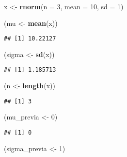 \documentclass[
  12pt,
]{book}
\newenvironment{Shaded}{\begin{snugshade}}{\end{snugshade}}
\newcommand{\DataTypeTok}[1]{\textcolor[rgb]{0.13,0.29,0.53}{#1}}
\newcommand{\DecValTok}[1]{\textcolor[rgb]{0.00,0.00,0.81}{#1}}
\newcommand{\KeywordTok}[1]{\textcolor[rgb]{0.13,0.29,0.53}{\textbf{#1}}}
\newcommand{\NormalTok}[1]{#1}
\newcommand{\StringTok}[1]{\textcolor[rgb]{0.31,0.60,0.02}{#1}}
\begin{document}
\begin{Shaded}
\begin{Highlighting}[]
\NormalTok{x \textless{}{-}}\StringTok{ }\KeywordTok{rnorm}\NormalTok{(}\DataTypeTok{n =} \DecValTok{3}\NormalTok{, }\DataTypeTok{mean =} \DecValTok{10}\NormalTok{, }\DataTypeTok{sd =} \DecValTok{1}\NormalTok{)}

\NormalTok{(mu \textless{}{-}}\StringTok{ }\KeywordTok{mean}\NormalTok{(x))}
\end{Highlighting}
\end{Shaded}

\begin{verbatim}
## [1] 10.22127
\end{verbatim}

\begin{Shaded}
\begin{Highlighting}[]
\NormalTok{(sigma \textless{}{-}}\StringTok{ }\KeywordTok{sd}\NormalTok{(x))}
\end{Highlighting}
\end{Shaded}

\begin{verbatim}
## [1] 1.185713
\end{verbatim}

\begin{Shaded}
\begin{Highlighting}[]
\NormalTok{(n \textless{}{-}}\StringTok{ }\KeywordTok{length}\NormalTok{(x))}
\end{Highlighting}
\end{Shaded}

\begin{verbatim}
## [1] 3
\end{verbatim}

\begin{Shaded}
\begin{Highlighting}[]
\NormalTok{(mu\_previa \textless{}{-}}\StringTok{ }\DecValTok{0}\NormalTok{)}
\end{Highlighting}
\end{Shaded}

\begin{verbatim}
## [1] 0
\end{verbatim}

\begin{Shaded}
\begin{Highlighting}[]
\NormalTok{(sigma\_previa \textless{}{-}}\StringTok{ }\DecValTok{1}\NormalTok{)}
\end{Highlighting}
\end{Shaded}
\end{document}
